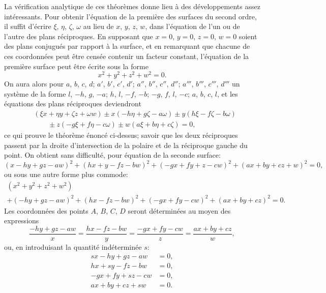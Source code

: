 \documentclass[11pt,a4paper]{book}
\begin{document}
La v\'{e}rification analytique de ces th\'{e}or\`{e}mes donne lieu \`{a} des d\'{e}veloppements assez int\'{e}ressants. Pour obtenir l'\'{e}quation de la premi\`{e}re des surfaces du second ordre, il suffit d'\'{e}crire $\xi$, $\eta$, $\zeta$, $\omega$ au lieu de $x$, $y$, $z$, $w$, dans l'\'{e}quation de l'un ou de l'autre des plans r\'{e}ciproques. En supposant que $x=0$, $y=0$, $z=0$, $w=0$ soient des plans conjugu\'{e}s par rapport \`{a} la surface, et en remarquant que chacune de ces coordonn\'{e}es peut \^{e}tre cens\'{e}e contenir un facteur constant, l'\'{e}quation de la premi\`{e}re surface peut \^{e}tre \'{e}crite sous la forme
\[
x^{2} + y^{2} + z^{2} + w^{2} = 0.
\]
On aura alors pour $a$, $b$, $c$, $d$; $a'$, $b'$, $c'$, $d'$; $a''$, $b''$, $c''$, $d''$; $a'''$, $b'''$, $c'''$, $d'''$ un syst\`{e}me de la forme $l$, $-h$, $g$, $-a$; $h$, $l$, $-f$, $-b$; $-g$, $f$, $l$, $-c$; $a$, $b$, $c$, $l$, et les \'{e}quations des plans r\'{e}ciproques deviendront
\begin{align*}
&(\xi x + \eta y + \zeta z + \omega w) \pm x(-h\eta + g\zeta - a\omega) \pm y(h\xi - f\zeta - b\omega) \\
&\qquad \pm z(-g\xi + f\eta - c\omega) \pm w(a\xi + b\eta + c\zeta) = 0,
\end{align*}
ce qui prouve le th\'{e}or\`{e}me \'{e}nonc\'{e} ci-dessus; savoir que les deux r\'{e}ciproques passent par la droite d'intersection de la polaire et de la r\'{e}ciproque gauche du point. On obtient sans difficult\'{e}, pour \'{e}quation de la seconde surface:
\[
(x - hy + gz - aw)^{2} + (hx + y - fz - bw)^{2} + (-gx + fy + z - cw)^{2} + (ax + by + cz + w)^{2} = 0,
\]
ou sous une autre forme plus commode:
\begin{multline*}
(x^{2} + y^{2} + z^{2} + w^{2}) \\
+ (-hy + gz - aw)^{2} + (hx - fz - bw)^{2} + (-gx + fy - cw)^{2} + (ax + by + cz)^{2} = 0.
\end{multline*}
Les coordonn\'{e}es des points $A$, $B$, $C$, $D$ seront d\'{e}termin\'{e}es au moyen des expressions
\[
\frac{-hy + gz - aw}{x} = \frac{hx - fz - bw}{y} = \frac{-gx + fy - cw}{z} = \frac{ax + by + cz}{w},
\]
ou, en introduisant la quantit\'{e} ind\'{e}termin\'{e}e $s$:
\begin{align*}
sx - hy + gz - aw &= 0, \\
hx + sy - fz - bw &= 0, \\
-gx + fy + sz - cw &= 0, \\
ax + by + cz + sw &= 0.
\end{align*}
\end{document}
